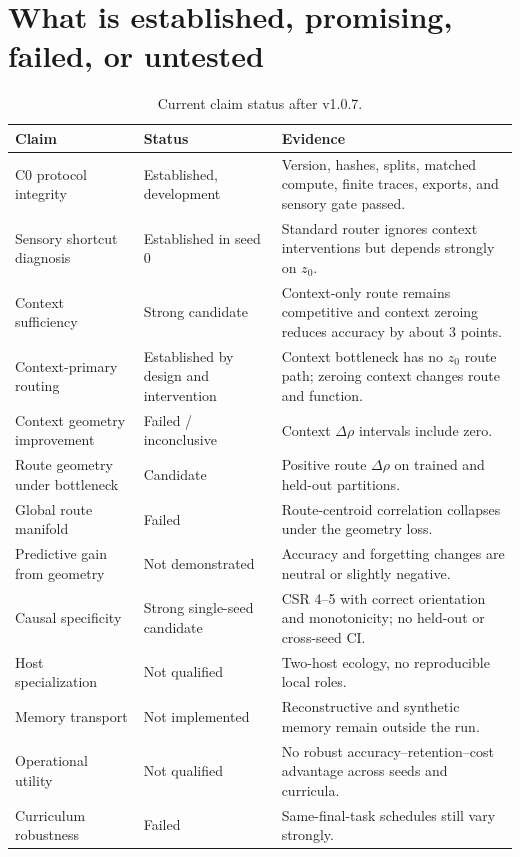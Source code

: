 \documentclass[11pt,a4paper]{article}
\begin{document}
\section{What is established, promising, failed, or untested}

\begin{table}[H]
\centering
\small
\begin{tabularx}{\textwidth}{p{3.8cm}p{2.5cm}Y}
\toprule
\textbf{Claim} & \textbf{Status} & \textbf{Evidence}\\
\midrule
C0 protocol integrity & Established, development & Version, hashes, splits, matched compute, finite traces, exports, and sensory gate passed.\\
Sensory shortcut diagnosis & Established in seed 0 & Standard router ignores context interventions but depends strongly on $z_0$.\\
Context sufficiency & Strong candidate & Context-only route remains competitive and context zeroing reduces accuracy by about 3 points.\\
Context-primary routing & Established by design and intervention & Context bottleneck has no $z_0$ route path; zeroing context changes route and function.\\
Context geometry improvement & Failed / inconclusive & Context $\Delta\rho$ intervals include zero.\\
Route geometry under bottleneck & Candidate & Positive route $\Delta\rho$ on trained and held-out partitions.\\
Global route manifold & Failed & Route-centroid correlation collapses under the geometry loss.\\
Predictive gain from geometry & Not demonstrated & Accuracy and forgetting changes are neutral or slightly negative.\\
Causal specificity & Strong single-seed candidate & CSR 4--5 with correct orientation and monotonicity; no held-out or cross-seed CI.\\
Host specialization & Not qualified & Two-host ecology, no reproducible local roles.\\
Memory transport & Not implemented & Reconstructive and synthetic memory remain outside the run.\\
Operational utility & Not qualified & No robust accuracy--retention--cost advantage across seeds and curricula.\\
Curriculum robustness & Failed & Same-final-task schedules still vary strongly.\\
\bottomrule
\end{tabularx}
\caption{Current claim status after v1.0.7.}
\end{table}
\end{document}
